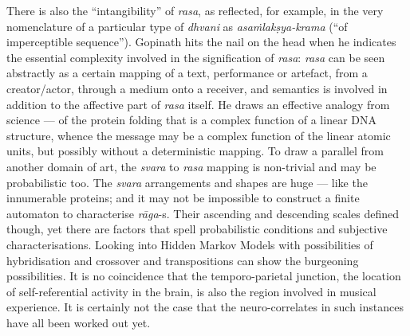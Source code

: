 There is also the “intangibility” of \textsl{rasa}, as reflected, for example, in the very nomenclature of a particular type of \textsl{dhvani} as \textsl{asaṁlakṣya-krama} (“of imperceptible sequence”). Gopinath hits the nail on the head when he indicates the essential complexity involved in the signification of \textsl{rasa}: \textsl{rasa} can be seen abstractly as a certain mapping of a text, performance or artefact, from a creator/actor, through a medium onto a receiver, and semantics is involved in addition to the affective part of \textsl{rasa} itself. He draws an effective analogy from science --- of the protein folding that is a complex function of a linear DNA structure, whence the message may be a complex function of the linear atomic units, but possibly without a deterministic mapping. To draw a parallel from another domain of art, the \textsl{svara} to \textsl{rasa} mapping is non-trivial and may be probabilistic too. The \textsl{svara} arrangements and shapes are huge --- like the innumerable proteins; and it may not be impossible to construct a finite automaton to characterise \textsl{rāga}-s. Their ascending and descending scales defined though, yet there are factors that spell probabilistic conditions and subjective characterisations. Looking into Hidden Markov Models with possibilities of hybridisation and crossover and transpositions can show the burgeoning possibilities. It is no coincidence that the temporo-parietal junction, the location of self-referential activity in the brain, is also the region involved in musical experience. It is certainly not the case that the neuro-correlates in such instances have all been worked out yet.


